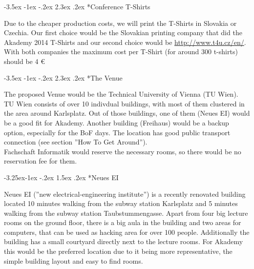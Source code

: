 \documentclass[10pt,a4paper]{article}
\makeatletter
\renewcommand\section{%
\@startsection{section}{1}{\z@}%
              {-3.5ex \@plus -1ex \@minus -.2ex}%
              {2.3ex \@plus.2ex}%
              {\color{kdelight}\sffamily\LARGE\bfseries}}
\renewcommand\subsection{%
\@startsection{subsection}{2}{\z@}%
              {-3.25ex\@plus -1ex \@minus -.2ex}%
              {1.5ex \@plus .2ex}%
              {\color{kdelight}\sffamily\Large\bfseries}}
\makeatother
\begin{document}
\cleardoublepage

\section*{Conference T-Shirts}
Due to the cheaper production costs, we will print the T-Shirts in Slovakia or Czechia. Our first choice would be the Slovakian printing company that did the Akademy 2014 T-Shirts and our second choice would be \url{http://www.t4u.cz/en/}. With both companies the maximum cost per T-Shirt (for around 300 t-shirts) should be 4 \euro{}

\cleardoublepage

\section*{The Venue}
The proposed Venue would be the Technical University of Vienna (TU Wien). TU Wien consists of over 10 indivdual buildings, with most of them clustered in the area around Karlsplatz. Out of those buildings, one of them (Neues EI) would be a good fit for Akademy. Another building (Freihaus) would be a backup option, especially for the BoF days. The location has good public transport connection (see section ''How To Get Around'').\\
Fachschaft Informatik would reserve the necessary rooms, so there would be no reservation fee for them.

\subsection*{Neues EI}

Neues EI (''new electrical-engineering institute'') is a recently renovated building located 10 minutes walking from the subway station Karlsplatz and 5 minutes walking from the subway station Taubstummengasse. Apart from four big lecture rooms on the ground floor, there is a big aula in the building and two areas for computers, that can be used as hacking area for over 100 people. Additionally the building has a small courtyard directly next to the lecture rooms. For Akademy this would be the preferred location due to it being more representative, the simple building layout and easy to find rooms.

\vspace{10pt}
\end{document}
